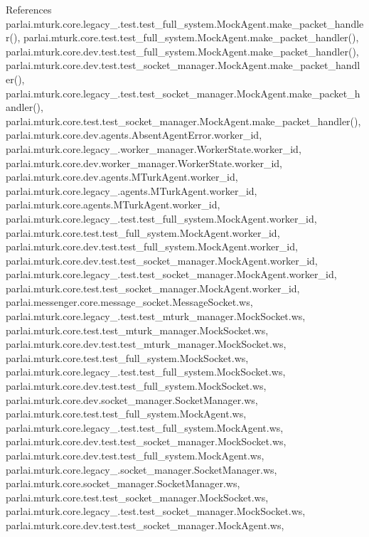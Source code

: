 References parlai.\+mturk.\+core.\+legacy\+\_.\+test.\+test\+\_\+full\+\_\+system.\+Mock\+Agent.\+make\+\_\+packet\+\_\+handler(), parlai.\+mturk.\+core.\+test.\+test\+\_\+full\+\_\+system.\+Mock\+Agent.\+make\+\_\+packet\+\_\+handler(), parlai.\+mturk.\+core.\+dev.\+test.\+test\+\_\+full\+\_\+system.\+Mock\+Agent.\+make\+\_\+packet\+\_\+handler(), parlai.\+mturk.\+core.\+dev.\+test.\+test\+\_\+socket\+\_\+manager.\+Mock\+Agent.\+make\+\_\+packet\+\_\+handler(), parlai.\+mturk.\+core.\+legacy\+\_.\+test.\+test\+\_\+socket\+\_\+manager.\+Mock\+Agent.\+make\+\_\+packet\+\_\+handler(), parlai.\+mturk.\+core.\+test.\+test\+\_\+socket\+\_\+manager.\+Mock\+Agent.\+make\+\_\+packet\+\_\+handler(), parlai.\+mturk.\+core.\+dev.\+agents.\+Absent\+Agent\+Error.\+worker\+\_\+id, parlai.\+mturk.\+core.\+legacy\+\_.\+worker\+\_\+manager.\+Worker\+State.\+worker\+\_\+id, parlai.\+mturk.\+core.\+dev.\+worker\+\_\+manager.\+Worker\+State.\+worker\+\_\+id, parlai.\+mturk.\+core.\+dev.\+agents.\+M\+Turk\+Agent.\+worker\+\_\+id, parlai.\+mturk.\+core.\+legacy\+\_.\+agents.\+M\+Turk\+Agent.\+worker\+\_\+id, parlai.\+mturk.\+core.\+agents.\+M\+Turk\+Agent.\+worker\+\_\+id, parlai.\+mturk.\+core.\+legacy\+\_.\+test.\+test\+\_\+full\+\_\+system.\+Mock\+Agent.\+worker\+\_\+id, parlai.\+mturk.\+core.\+test.\+test\+\_\+full\+\_\+system.\+Mock\+Agent.\+worker\+\_\+id, parlai.\+mturk.\+core.\+dev.\+test.\+test\+\_\+full\+\_\+system.\+Mock\+Agent.\+worker\+\_\+id, parlai.\+mturk.\+core.\+dev.\+test.\+test\+\_\+socket\+\_\+manager.\+Mock\+Agent.\+worker\+\_\+id, parlai.\+mturk.\+core.\+legacy\+\_.\+test.\+test\+\_\+socket\+\_\+manager.\+Mock\+Agent.\+worker\+\_\+id, parlai.\+mturk.\+core.\+test.\+test\+\_\+socket\+\_\+manager.\+Mock\+Agent.\+worker\+\_\+id, parlai.\+messenger.\+core.\+message\+\_\+socket.\+Message\+Socket.\+ws, parlai.\+mturk.\+core.\+legacy\+\_.\+test.\+test\+\_\+mturk\+\_\+manager.\+Mock\+Socket.\+ws, parlai.\+mturk.\+core.\+test.\+test\+\_\+mturk\+\_\+manager.\+Mock\+Socket.\+ws, parlai.\+mturk.\+core.\+dev.\+test.\+test\+\_\+mturk\+\_\+manager.\+Mock\+Socket.\+ws, parlai.\+mturk.\+core.\+test.\+test\+\_\+full\+\_\+system.\+Mock\+Socket.\+ws, parlai.\+mturk.\+core.\+legacy\+\_.\+test.\+test\+\_\+full\+\_\+system.\+Mock\+Socket.\+ws, parlai.\+mturk.\+core.\+dev.\+test.\+test\+\_\+full\+\_\+system.\+Mock\+Socket.\+ws, parlai.\+mturk.\+core.\+dev.\+socket\+\_\+manager.\+Socket\+Manager.\+ws, parlai.\+mturk.\+core.\+test.\+test\+\_\+full\+\_\+system.\+Mock\+Agent.\+ws, parlai.\+mturk.\+core.\+legacy\+\_.\+test.\+test\+\_\+full\+\_\+system.\+Mock\+Agent.\+ws, parlai.\+mturk.\+core.\+dev.\+test.\+test\+\_\+socket\+\_\+manager.\+Mock\+Socket.\+ws, parlai.\+mturk.\+core.\+dev.\+test.\+test\+\_\+full\+\_\+system.\+Mock\+Agent.\+ws, parlai.\+mturk.\+core.\+legacy\+\_.\+socket\+\_\+manager.\+Socket\+Manager.\+ws, parlai.\+mturk.\+core.\+socket\+\_\+manager.\+Socket\+Manager.\+ws, parlai.\+mturk.\+core.\+test.\+test\+\_\+socket\+\_\+manager.\+Mock\+Socket.\+ws, parlai.\+mturk.\+core.\+legacy\+\_.\+test.\+test\+\_\+socket\+\_\+manager.\+Mock\+Socket.\+ws, parlai.\+mturk.\+core.\+dev.\+test.\+test\+\_\+socket\+\_\+manager.\+Mock\+Agent.\+ws, 